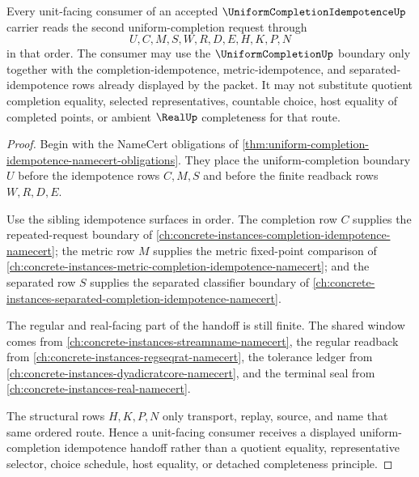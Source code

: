 \begin{theorem}
\label{thm:uniform-completion-idempotence-unit-handoff}
Every unit-facing consumer of an accepted $\UniformCompletionIdempotenceUp$ carrier reads the second uniform-completion request through
$$
U,C,M,S,W,R,D,E,H,K,P,N
$$
in that order. The consumer may use the $\UniformCompletionUp$ boundary only together with the completion-idempotence, metric-idempotence, and separated-idempotence rows already displayed by the packet. It may not substitute quotient completion equality, selected representatives, countable choice, host equality of completed points, or ambient $\RealUp$ completeness for that route.
\end{theorem}
\begin{proof}
Begin with the NameCert obligations of \autoref{thm:uniform-completion-idempotence-namecert-obligations}. They place the uniform-completion boundary $U$ before the idempotence rows $C,M,S$ and before the finite readback rows $W,R,D,E$.

Use the sibling idempotence surfaces in order. The completion row $C$ supplies the repeated-request boundary of \autoref{ch:concrete-instances-completion-idempotence-namecert}; the metric row $M$ supplies the metric fixed-point comparison of \autoref{ch:concrete-instances-metric-completion-idempotence-namecert}; and the separated row $S$ supplies the separated classifier boundary of \autoref{ch:concrete-instances-separated-completion-idempotence-namecert}.

The regular and real-facing part of the handoff is still finite. The shared window comes from \autoref{ch:concrete-instances-streamname-namecert}, the regular readback from \autoref{ch:concrete-instances-regseqrat-namecert}, the tolerance ledger from \autoref{ch:concrete-instances-dyadicratcore-namecert}, and the terminal seal from \autoref{ch:concrete-instances-real-namecert}.

The structural rows $H,K,P,N$ only transport, replay, source, and name that same ordered route. Hence a unit-facing consumer receives a displayed uniform-completion idempotence handoff rather than a quotient equality, representative selector, choice schedule, host equality, or detached completeness principle.
\end{proof}


